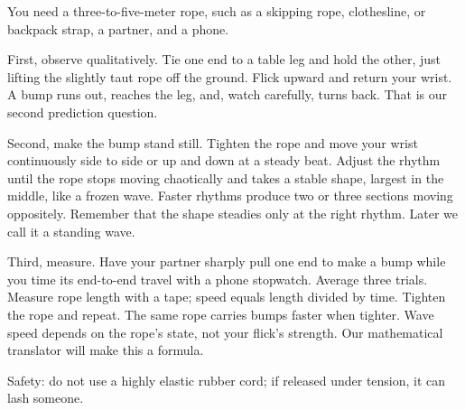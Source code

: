 
\begin{experiment}
You need a three-to-five-meter rope, such as a skipping rope, clothesline, or backpack strap, a partner, and a phone.

First, observe qualitatively. Tie one end to a table leg and hold the other, just lifting the slightly taut rope off the ground. Flick upward and return your wrist. A bump runs out, reaches the leg, and, watch carefully, turns back. That is our second prediction question.

Second, make the bump stand still. Tighten the rope and move your wrist continuously side to side or up and down at a steady beat. Adjust the rhythm until the rope stops moving chaotically and takes a stable shape, largest in the middle, like a frozen wave. Faster rhythms produce two or three sections moving oppositely. Remember that the shape steadies only at the right rhythm. Later we call it a standing wave.

Third, measure. Have your partner sharply pull one end to make a bump while you time its end-to-end travel with a phone stopwatch. Average three trials. Measure rope length with a tape; speed equals length divided by time. Tighten the rope and repeat. The same rope carries bumps faster when tighter. Wave speed depends on the rope's state, not your flick's strength. Our mathematical translator will make this a formula.

Safety: do not use a highly elastic rubber cord; if released under tension, it can lash someone.
\end{experiment}



